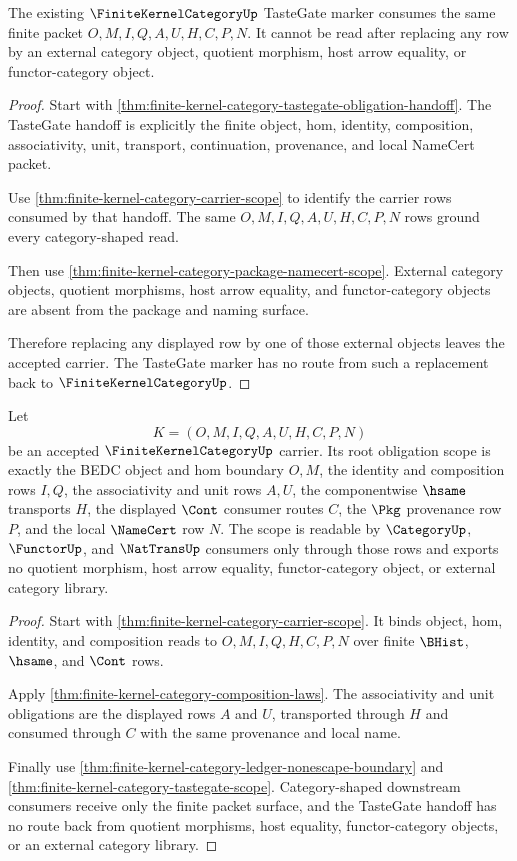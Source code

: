 \begin{theorem}
\label{thm:finite-kernel-category-tastegate-scope}
The existing $\FiniteKernelCategoryUp$ TasteGate marker consumes the same finite packet $O,M,I,Q,A,U,H,C,P,N$. It cannot be read after replacing any row by an external category object, quotient morphism, host arrow equality, or functor-category object.
\end{theorem}
\begin{proof}
Start with \autoref{thm:finite-kernel-category-tastegate-obligation-handoff}. The TasteGate handoff is explicitly the finite object, hom, identity, composition, associativity, unit, transport, continuation, provenance, and local NameCert packet.

Use \autoref{thm:finite-kernel-category-carrier-scope} to identify the carrier rows consumed by that handoff. The same $O,M,I,Q,A,U,H,C,P,N$ rows ground every category-shaped read.

Then use \autoref{thm:finite-kernel-category-package-namecert-scope}. External category objects, quotient morphisms, host arrow equality, and functor-category objects are absent from the package and naming surface.

Therefore replacing any displayed row by one of those external objects leaves the accepted carrier. The TasteGate marker has no route from such a replacement back to $\FiniteKernelCategoryUp$.
\end{proof}

\begin{theorem}
\label{thm:finite-kernel-category-root-obligation-scope}
Let
$$
K=(O,M,I,Q,A,U,H,C,P,N)
$$
be an accepted $\FiniteKernelCategoryUp$ carrier. Its root obligation scope is exactly the BEDC object and hom boundary $O,M$, the identity and composition rows $I,Q$, the associativity and unit rows $A,U$, the componentwise $\hsame$ transports $H$, the displayed $\Cont$ consumer routes $C$, the $\Pkg$ provenance row $P$, and the local $\NameCert$ row $N$. The scope is readable by $\CategoryUp$, $\FunctorUp$, and $\NatTransUp$ consumers only through those rows and exports no quotient morphism, host arrow equality, functor-category object, or external category library.
\end{theorem}
\begin{proof}
Start with \autoref{thm:finite-kernel-category-carrier-scope}. It binds object, hom, identity, and composition reads to $O,M,I,Q,H,C,P,N$ over finite $\BHist$, $\hsame$, and $\Cont$ rows.

Apply \autoref{thm:finite-kernel-category-composition-laws}. The associativity and unit obligations are the displayed rows $A$ and $U$, transported through $H$ and consumed through $C$ with the same provenance and local name.

Finally use \autoref{thm:finite-kernel-category-ledger-nonescape-boundary} and \autoref{thm:finite-kernel-category-tastegate-scope}. Category-shaped downstream consumers receive only the finite packet surface, and the TasteGate handoff has no route back from quotient morphisms, host equality, functor-category objects, or an external category library.
\end{proof}


